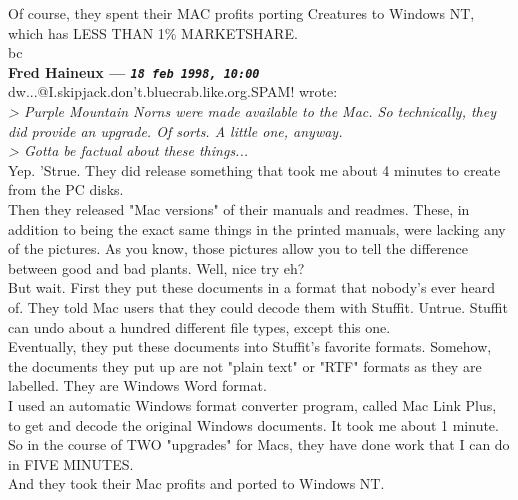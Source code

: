 \documentclass[11pt,twoside,a4paper]{article}
\begin{document}
\begin{multicols*}{2}
Of course, they spent their MAC profits porting Creatures to Windows NT, which has LESS THAN 1\% MARKETSHARE.~\\

bc~\\

 
		
	
		
\textbf{Fred Haineux --- \emph{\texttt{18 feb 1998, 10:00}}}~\\

dw...@I.skipjack.don't.bluecrab.like.org.SPAM! wrote:~\\
\emph{> Purple Mountain Norns were made available to the Mac. So technically, they did provide an upgrade. Of sorts. A little one, anyway.}~\\

\emph{> Gotta be factual about these things...}~\\

Yep. 'Strue. They did release something that took me about 4 minutes to create from the PC disks.~\\

Then they released "Mac versions" of their manuals and readmes. These, in addition to being the exact same things in the printed manuals, were lacking any of the pictures. As you know, those pictures allow you to tell the difference between good and bad plants. Well, nice try eh?~\\

But wait. First they put these documents in a format that nobody's ever heard of. They told Mac users that they could decode them with Stuffit. Untrue. Stuffit can undo about a hundred different file types, except this one.~\\

Eventually, they put these documents into Stuffit's favorite formats. Somehow, the documents they put up are not "plain text" or "RTF" formats as they are labelled. They are Windows Word format.~\\

I used an automatic Windows format converter program, called Mac Link Plus, to get and decode the original Windows documents. It took me about 1 minute.~\\

So in the course of TWO "upgrades" for Macs, they have done work that I can do in FIVE MINUTES.~\\

And they took their Mac profits and ported to Windows NT.~\\


\end{multicols*}
\end{document}
